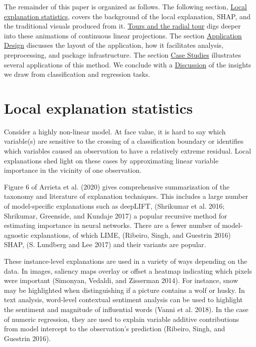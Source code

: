 \documentclass[
  article]{article}
\begin{document}
The remainder of this paper is organized as follows. The following section, \protect\hyperlink{sec:explanations}{Local explanation statistics}, covers the background of the local explanation, SHAP, and the traditional visuals produced from it. \protect\hyperlink{sec:tour}{Tours and the radial tour} digs deeper into these animations of continuous linear projections. The section \protect\hyperlink{sec:applicationdesign}{Application Design} discusses the layout of the application, how it facilitates analysis, preprocessing, and package infrastructure. The section \protect\hyperlink{sec:casestudies}{Case Studies} illustrates several applications of this method. We conclude with a \protect\hyperlink{sec:discussion}{Discussion} of the insights we draw from classification and regression tasks.

\hypertarget{sec:explanations}{%
\section{Local explanation statistics}\label{sec:explanations}}

Consider a highly non-linear model. At face value, it is hard to say which variable(s) are sensitive to the crossing of a classification boundary or identifies which variables caused an observation to have a relatively extreme residual. Local explanations shed light on these cases by approximating linear variable importance in the vicinity of one observation.

Figure 6 of Arrieta et al. (2020) gives comprehensive summarization of the taxonomy and literature of explanation techniques. This includes a large number of model-specific explanations such as deepLIFT, (Shrikumar et al. 2016; Shrikumar, Greenside, and Kundaje 2017) a popular recursive method for estimating importance in neural networks. There are a fewer number of model-agnostic explanations, of which LIME, (Ribeiro, Singh, and Guestrin 2016) SHAP, (S. Lundberg and Lee 2017) and their variants are popular.

These instance-level explanations are used in a variety of ways depending on the data. In images, saliency maps overlay or offset a heatmap indicating which pixels were important (Simonyan, Vedaldi, and Zisserman 2014). For instance, snow may be highlighted when distinguishing if a picture contains a wolf or husky. In text analysis, word-level contextual sentiment analysis can be used to highlight the sentiment and magnitude of influential words (Vanni et al. 2018). In the case of numeric regression, they are used to explain variable additive contributions from model intercept to the observation's prediction (Ribeiro, Singh, and Guestrin 2016).
\end{document}
